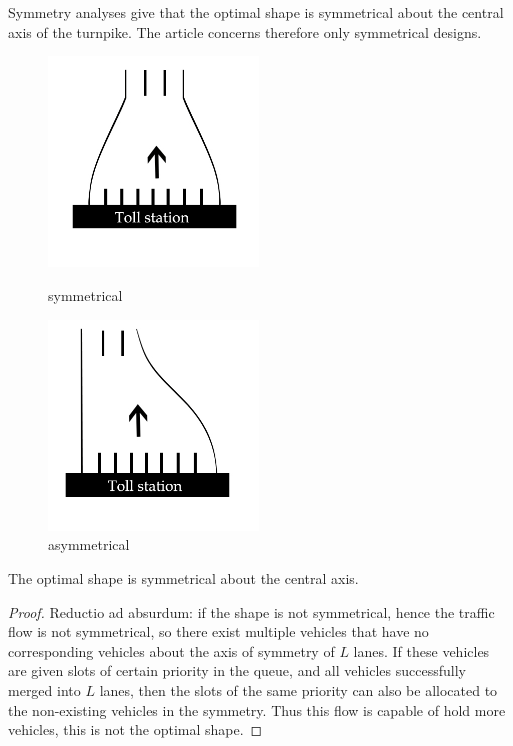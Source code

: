 \documentclass{mcmthesis}
\begin{document}
Symmetry analyses give that the optimal shape is symmetrical about the central axis of the turnpike. The article concerns therefore only symmetrical designs.
\begin{figure}
	\begin{minipage}[t]{0.5\linewidth}
		\centering
		\includegraphics[width=2.2in]{symmetrical.jpg}
		\caption{symmetrical}
		\label{symmetrical}
	\end{minipage}%
	\begin{minipage}[t]{0.5\linewidth}
		\centering
		\includegraphics[width=2.2in]{asymmetrical.jpg}
		\caption{asymmetrical}
		\label{asymmetrical}
	\end{minipage}
\end{figure}


\begin{Theorem} \label{thm:yingsongsheng}
The optimal shape is symmetrical about the central axis.
\end{Theorem}

\begin{proof}
Reductio ad absurdum: if the shape is not symmetrical, hence the traffic flow is not symmetrical, so there exist multiple vehicles that have no corresponding vehicles about the axis of symmetry of $L$ lanes. If these vehicles are given slots of certain priority in the queue, and all vehicles successfully merged into $L$ lanes, then the slots of the same priority can also be allocated to the non-existing vehicles in the symmetry. Thus this flow is capable of hold more vehicles, this is not the optimal shape.
\end{proof}
\end{document}
